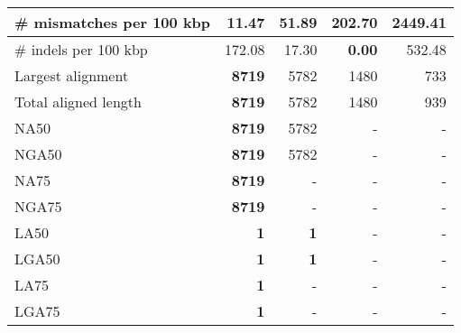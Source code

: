 \documentclass[12pt,a4paper]{article}
\begin{document}
\begin{table}[ht]
\begin{center}
\begin{tabular}{|l*{4}{|r}|}
\# mismatches per 100 kbp & {\bf 11.47} & 51.89 & 202.70 & 2449.41 \\ \hline
\# indels per 100 kbp & 172.08 & 17.30 & {\bf 0.00} & 532.48 \\ \hline
Largest alignment & {\bf 8719} & 5782 & 1480 & 733 \\ \hline
Total aligned length & {\bf 8719} & 5782 & 1480 & 939 \\ \hline
NA50 & {\bf 8719} & 5782 & - & - \\ \hline
NGA50 & {\bf 8719} & 5782 & - & - \\ \hline
NA75 & {\bf 8719} & - & - & - \\ \hline
NGA75 & {\bf 8719} & - & - & - \\ \hline
LA50 & {\bf 1} & {\bf 1} & - & - \\ \hline
LGA50 & {\bf 1} & {\bf 1} & - & - \\ \hline
LA75 & {\bf 1} & - & - & - \\ \hline
LGA75 & {\bf 1} & - & - & - \\ \hline
\end{tabular}
\end{center}
\end{table}
\end{document}

